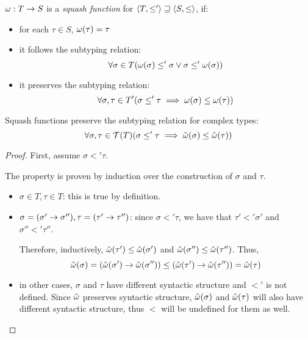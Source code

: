 \documentclass[main.tex]{subfiles}
\begin{document}
\begin{defn}\label{def:squashfn}
    $\omega: T \rightarrow S$ is a \emph{squash function} for
    $\langle T, \leq' \rangle \sqsupseteq \langle S, \leq \rangle$, if:
    \begin{itemize}
        \item for each $\tau \in S$, $\omega(\tau) = \tau$
        \item it follows the subtyping relation:
            \[ \forall \sigma \in T
                (\omega(\sigma) \leq' \sigma \lor \sigma \leq' \omega(\sigma)) \]
        \item it preserves the subtyping relation:
            \[ \forall \sigma, \tau \in T' (\sigma \leq' \tau \implies
                \omega(\sigma) \leq \omega(\tau)) \]
    \end{itemize}
\end{defn}

\begin{property}
    \label{prop:squash:preserve}
    Squash functions preserve the subtyping relation for complex types:
    \[ \forall \sigma, \tau \in \mathcal{T}( T ) (\sigma \leq' \tau \implies
        \hat{\omega}(\sigma) \leq \hat{\omega}(\tau)) \]
\end{property}
\begin{proof}
    First, assume $\sigma \less' \tau$.

    The property is proven by induction over the construction of $\sigma$
    and $\tau$.

    \begin{itemize}
        \item $\sigma \in T, \tau \in T$: this is true by definition.
        \item $\sigma = (\sigma' \rightarrow \sigma''), \tau = (\tau' \rightarrow \tau'')$:
            since $\sigma \less' \tau$, we have that $\tau' \less' \sigma'$
            and $\sigma'' \less' \tau''$.

            Therefore, inductively, $\hat{\omega}(\tau') \leq \hat{\omega}(\sigma')$
            and $\hat{\omega}(\sigma'') \leq \hat{\omega}(\tau'')$. Thus,
            \[
                \hat{\omega}(\sigma) = (\hat{\omega}(\sigma') \rightarrow \hat{\omega}(\sigma''))
                \leq
                (\hat{\omega}(\tau') \rightarrow \hat{\omega}(\tau'')) = \hat{\omega}(\tau)
            \]
        \item in other cases, $\sigma$ and $\tau$ have different syntactic
            structure and $\less'$ is not defined. Since $\hat{\omega}$ preserves
            syntactic structure, $\hat{\omega}(\sigma)$ and $\hat{\omega}(\tau)$
            will also have different syntactic structure, thus $\less$ will
            be undefined for them as well.
    \end{itemize}
\end{proof}
\end{document}
